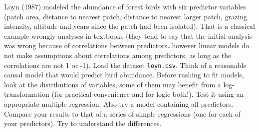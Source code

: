 \documentclass[12pt,a4paper]{scrartcl}\usepackage[]{graphicx}\usepackage[]{color}
\begin{document}
\begin{Exercise}[difficulty=2, title={Bird abundance}]
Loyn (1987) modeled the abundance of forest birds with six predictor variables (patch area, distance to nearest patch, distance to nearest larger patch, grazing intensity, altitude and years since the patch had been isolated).
That is a classical example wrongly analyses in textbooks (they tend to say that the initial analysis was wrong because of correlations between predictors\dots however linear models do not make assumptions about correlations among predictors, as long as the correlations are not 1 or -1).
Load the dataset \texttt{loyn.csv}. Think of a reasonable causal model that would predict bird abundance. 
Before rushing to fit models, look at the distributions of variables, some of them may benefit from a log-transformation (for practical convenience and for logic both!).
Test it using an appropriate multiple regression. Also try a model containing all predictors. Compare your results to that of a series of simple regressions (one for each of your predictors). Try to understand the differences.
\end{Exercise}
\end{document}

